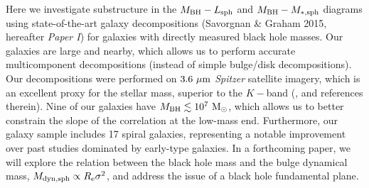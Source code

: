 \documentclass[preprint2]{emulateapj}
\begin{document}
Here we investigate substructure in the $M_{\rm BH} - L_{\rm sph}$ and $M_{\rm BH} - M_{\rm *,sph}$ diagrams 
using state-of-the-art galaxy decompositions (Savorgnan \& Graham 2015, hereafter \emph{Paper I}) 
for galaxies with directly measured black hole masses.
Our galaxies are large and nearby, which allows us to perform accurate multicomponent decompositions 
(instead of simple bulge/disk decompositions). 
Our decompositions were performed on $3.6\rm~\mu m$ \emph{Spitzer} satellite imagery, 
which is an excellent proxy for the stellar mass, superior to the $K-$band (\citealt{sheth2010}, and references therein).
Nine of our galaxies have $M_{\rm BH} \lesssim 10^7\rm~M_\odot$, 
which allows us to better constrain the slope of the correlation at the low-mass end.
Furthermore, our galaxy sample includes 17 spiral galaxies, 
representing a notable improvement over past studies dominated by early-type galaxies. 
In a forthcoming paper, we will explore the relation between the black hole mass and the bulge dynamical mass, 
$M_{\rm dyn,sph} \propto R_{\rm e} \sigma^2$, and address the issue of a black hole fundamental plane.
\end{document}
